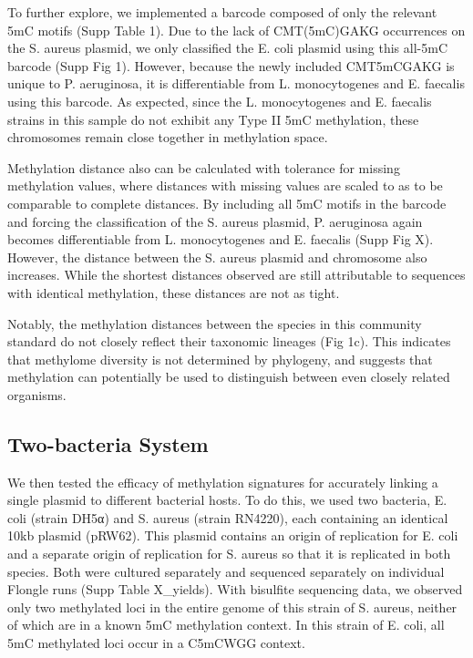 To further explore, we implemented a barcode composed of only the relevant 5mC motifs (Supp Table 1). Due to the lack of CMT(5mC)GAKG occurrences on the S. aureus plasmid, we only classified the E. coli plasmid using this all-5mC barcode (Supp Fig 1). However, because the newly included CMT5mCGAKG is unique to P. aeruginosa, it is differentiable from L. monocytogenes and E. faecalis using this barcode. As expected, since the L. monocytogenes and E. faecalis strains in this sample do not exhibit any Type II 5mC methylation, these chromosomes remain close together in methylation space.

Methylation distance also can be calculated with tolerance for missing methylation values, where distances with missing values are scaled to as to be comparable to complete distances. By including all 5mC motifs in the barcode and forcing the classification of the S. aureus plasmid, P. aeruginosa again becomes differentiable from L. monocytogenes and E. faecalis (Supp Fig X). However, the distance between the S. aureus plasmid and chromosome also increases. While the shortest distances observed are still attributable to sequences with identical methylation, these distances are not as tight.

Notably, the methylation distances between the species in this community standard do not closely reflect their taxonomic lineages (Fig 1c). This indicates that methylome diversity is not determined by phylogeny, and suggests that methylation can potentially be used to distinguish between even closely related organisms.

\subsection{Two-bacteria System}
\label{sec:byard}

We then tested the efficacy of methylation signatures for accurately linking a single plasmid to different bacterial hosts. To do this, we used two bacteria, E. coli (strain DH5α) and S. aureus (strain RN4220), each containing an identical 10kb plasmid (pRW62). This plasmid contains an origin of replication for E. coli and a separate origin of replication for S. aureus so that it is replicated in both species. Both were cultured separately and sequenced separately on individual Flongle runs (Supp Table X_yields). With bisulfite sequencing data, we observed only two methylated loci in the entire genome of this strain of S. aureus, neither of which are in a known 5mC methylation context. In this strain of E. coli, all 5mC methylated loci occur in a C5mCWGG context.

